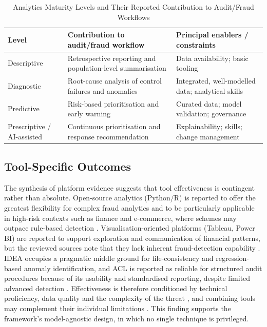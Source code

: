 \documentclass[conference]{IEEEtran}
\begin{document}
\begin{table}[!t]
\caption{Analytics Maturity Levels and Their Reported Contribution to Audit/Fraud Workflows}
\label{tab:maturity}
\centering
\scriptsize
\begin{tabular}{p{} p{} p{}}
\toprule
\textbf{Level} & \textbf{Contribution to audit/fraud workflow} & \textbf{Principal enablers / constraints} \\
\midrule
Descriptive & Retrospective reporting and population-level summarisation & Data availability; basic tooling \\
Diagnostic & Root-cause analysis of control failures and anomalies & Integrated, well-modelled data; analytical skills \\
Predictive & Risk-based prioritisation and early warning & Curated data; model validation; governance \\
Prescriptive / AI-assisted & Continuous prioritisation and response recommendation & Explainability; skills; change management \\
\bottomrule
\end{tabular}
\end{table}

\subsection{Tool-Specific Outcomes}

The synthesis of platform evidence suggests that tool effectiveness is contingent rather than absolute. Open-source analytics (Python/R) is reported to offer the greatest flexibility for complex fraud analytics and to be particularly applicable in high-risk contexts such as finance and e-commerce, where schemes may outpace rule-based detection \cite{b35,b36}. Visualisation-oriented platforms (Tableau, Power BI) are reported to support exploration and communication of financial patterns, but the reviewed sources note that they lack inherent fraud-detection capability \cite{b29}. IDEA occupies a pragmatic middle ground for file-consistency and regression-based anomaly identification, and ACL is reported as reliable for structured audit procedures because of its usability and standardised reporting, despite limited advanced detection \cite{b30}. Effectiveness is therefore conditioned by technical proficiency, data quality and the complexity of the threat \cite{b37,b12}, and combining tools may complement their individual limitations \cite{b38}. This finding supports the framework's model-agnostic design, in which no single technique is privileged.
\end{document}
